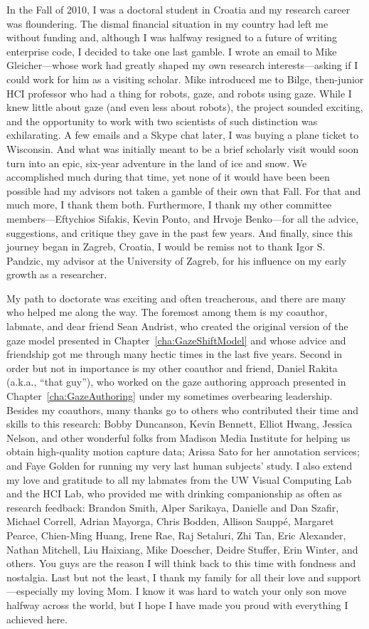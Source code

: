 In the Fall of 2010, I was a doctoral student in Croatia and my research career was floundering. The dismal financial situation in my country had left me without funding and, although I was halfway resigned to a future of writing enterprise code, I decided to take one last gamble. I wrote an email to Mike Gleicher---whose work had greatly shaped my own research interests---asking if I could work for him as a visiting scholar. Mike introduced me to Bilge, then-junior HCI professor who had a thing for robots, gaze, and robots using gaze. While I knew little about gaze (and even less about robots), the project sounded exciting, and the opportunity to work with two scientists of such distinction was exhilarating. A few emails and a Skype chat later, I was buying a plane ticket to Wisconsin. And what was initially meant to be a brief scholarly visit would soon turn into an epic, six-year adventure in the land of ice and snow. We accomplished much during that time, yet none of it would have been been possible had my advisors not taken a gamble of their own that Fall. For that and much more, I thank them both. Furthermore, I thank my other committee members---Eftychios Sifakis, Kevin Ponto, and Hrvoje Benko---for all the advice, suggestions, and critique they gave in the past few years. And finally, since this journey began in Zagreb, Croatia, I would be remiss not to thank Igor S. Pandzic, my advisor at the University of Zagreb, for his influence on my early growth as a researcher.

My path to doctorate was exciting and often treacherous, and there are many who helped me along the way. The foremost among them is my coauthor, labmate, and dear friend Sean Andrist, who created the original version of the gaze model presented in Chapter~\ref{cha:GazeShiftModel} and whose advice and friendship got me through many hectic times in the last five years. Second in order but not in importance is my other coauthor and friend, Daniel Rakita (a.k.a., ``that guy''), who worked on the gaze authoring approach presented in Chapter~\ref{cha:GazeAuthoring} under my sometimes overbearing leadership. Besides my coauthors, many thanks go to others who contributed their time and skills to this research: Bobby Duncanson, Kevin Bennett, Elliot Hwang, Jessica Nelson, and other wonderful folks from Madison Media Institute for helping us obtain high-quality motion capture data; Arissa Sato for her annotation services; and Faye Golden for running my very last human subjects' study. I also extend my love and gratitude to all my labmates from the UW Visual Computing Lab and the HCI Lab, who provided me with drinking companionship as often as research feedback: Brandon Smith, Alper Sarikaya, Danielle and Dan Szafir, Michael Correll, Adrian Mayorga, Chris Bodden, Allison Saupp\'{e}, Margaret Pearce, Chien-Ming Huang, Irene Rae, Raj Setaluri, Zhi Tan, Eric Alexander, Nathan Mitchell, Liu Haixiang, Mike Doescher, Deidre Stuffer, Erin Winter, and others. You guys are the reason I will think back to this time with fondness and nostalgia. Last but not the least, I thank my family for all their love and support---especially my loving Mom. I know it was hard to watch your only son move halfway across the world, but I hope I have made you proud with everything I achieved here. 